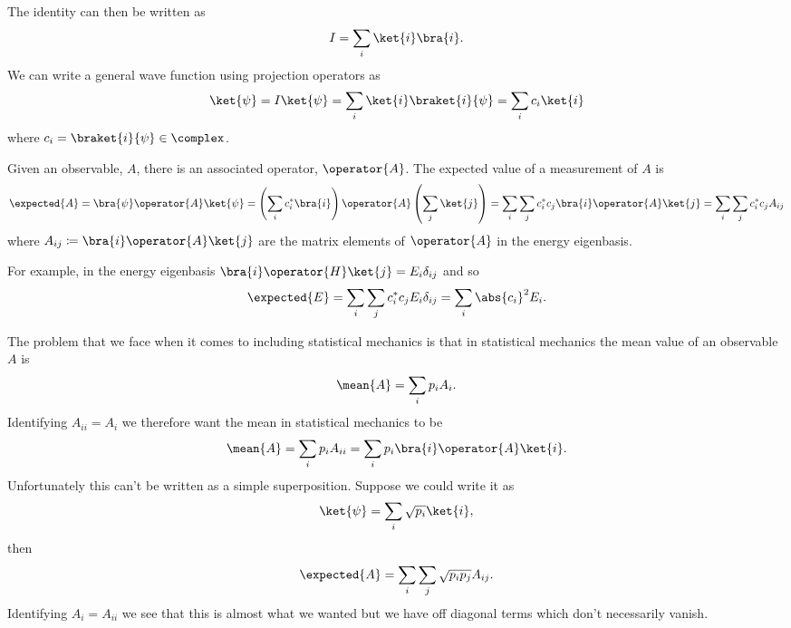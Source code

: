\documentclass[fleqn]{NotesClass}
\newcommand*{\ident}{I}
\begin{document}
    The identity can then be written as
    \begin{equation}
        \ident = \sum_i \ket{i}\bra{i}.
    \end{equation}
    We can write a general wave function using projection operators as
    \begin{equation}
        \ket{\psi} = \ident\ket{\psi} = \sum_i \ket{i}\braket{i}{\psi} = \sum_i c_i\ket{i}
    \end{equation}
    where \(c_i = \braket{i}{\psi} \in \complex\).
    
    Given an observable, \(A\), there is an associated operator, \(\operator{A}\).
    The expected value of a measurement of \(A\) is
    \begin{equation*}
        \expected{A} = \bra{\psi}\operator{A}\ket{\psi} = \left( \sum_i c_i^*\bra{i} \right) \operator{A} \left( \sum_j \ket{j} \right) = \sum_i\sum_j c_i^*c_j\bra{i}\operator{A}\ket{j} = \sum_i \sum_j c_i^* c_j A_{ij}
    \end{equation*}
    where \(A_{ij} \coloneqq \bra{i}\operator{A}\ket{j}\) are the matrix elements of \(\operator{A}\) in the energy eigenbasis.
    
    For example, in the energy eigenbasis \(\bra{i}\operator{H}\ket{j} = E_i\delta_{ij}\) and so
    \begin{equation}
        \expected{E} = \sum_i\sum_j c_i^*c_j E_i\delta_{ij} = \sum_i \abs{c_i}^2 E_i.
    \end{equation}
    
    The problem that we face when it comes to including statistical mechanics is that in statistical mechanics the mean value of an observable \(A\) is
    \begin{equation}
        \mean{A} = \sum_i p_i A_i.
    \end{equation}
    Identifying \(A_{ii} = A_i\) we therefore want the mean in statistical mechanics to be
    \begin{equation}
        \mean{A} = \sum_i p_i A_{ii} = \sum_i p_i \bra{i} \operator{A} \ket{i}.
    \end{equation}
    Unfortunately this can't be written as a simple superposition.
    Suppose we could write it as
    \begin{equation}
        \ket{\psi} = \sum_i \sqrt{p_i} \ket{i},
    \end{equation}
    then
    \begin{equation}
        \expected{A} = \sum_i \sum_j \sqrt{p_ip_j}A_{ij}.
    \end{equation}
    Identifying \(A_i = A_{ii}\) we see that this is almost what we wanted but we have off diagonal terms which don't necessarily vanish.
    
\end{document}

